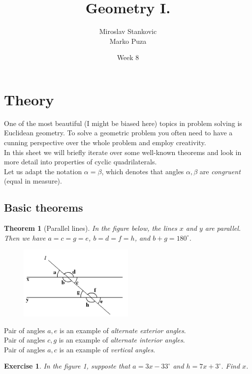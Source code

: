 \documentclass[11pt,a5paper]{article}
\title{\textbf{Geometry I.}}
\date{Week 8}
\author{Miroslav Stankovic\\ Marko Puza}
\newtheorem{exercise}{Exercise}
\newtheorem*{Theorem}{Theorem}
\begin{document}
\maketitle

\section{Theory}

\noindent One of the most beautiful (I might be biased here) topics in problem solving is Euclidean geometry. To solve a geometric problem you often need to have a cunning perspective over the whole problem and employ creativity. \\
In this sheet we will briefly iterate over some well-known theorems and look in more detail into properties of cyclic quadrilaterals. \\
Let us adapt the notation $\alpha = \beta$, which denotes that angles $\alpha, \beta$ are \emph{congruent} (equal in measure).
\subsection*{Basic theorems}

\begin{Theorem}[Parallel lines]
	In the figure below, the lines $x$ and $y$ are parallel. Then we have  $a=c=g=e$, $b=d=f=h$, and $b+g = 180^{\circ}$.
\end{Theorem}

\begin{figure}[h] \begin{center}
\includegraphics[width=0.5\textwidth]{parallel}
\end{center} \end{figure}
\noindent Pair of angles $a, e$ is an example of \emph{alternate exterior angles}.\\
\noindent Pair of angles $c, g$ is an example of \emph{alternate interior angles}.\\
\noindent Pair of angles $a, c$ is an example of \emph{vertical angles}.
\begin{exercise}
In the figure 1, supposte that $a=3x-33^{\circ}$ and $h=7x+3^{\circ}$. Find $x$.
\end{exercise}
\end{document}
